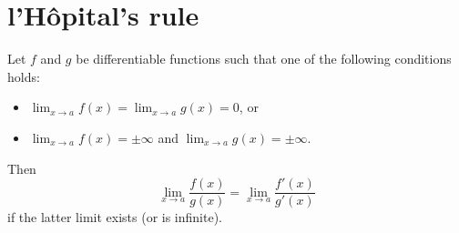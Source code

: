 \documentclass[../book/calcnotes.tex]{subfiles}
\begin{document}
\section{l'H\^{o}pital's rule}
\label{sec:lhospital}

\begin{theorem}
  \label{thm:lhospital}
  Let $f$ and $g$ be differentiable functions such that one of the following conditions holds:
  \begin{itemize}
  \item $\lim_{x \to a} f(x) = \lim_{x \to a} g(x) = 0$, or
  \item $\lim_{x \to a} f(x) = \pm \infty$ and $\lim_{x \to a} g(x) = \pm \infty$.
  \end{itemize}
  Then
  \begin{equation}
    \label{eq:lhospital}
    \lim_{x \to a} \frac{f(x)}{g(x)} = \lim_{x \to a} \frac{f'(x)}{g'(x)}
  \end{equation}
  if the latter limit exists (or is infinite).
\end{theorem}

\begin{exercises}
\end{exercises}
\end{document}
